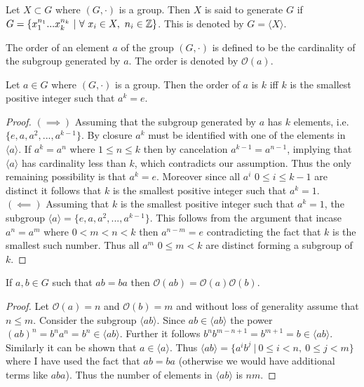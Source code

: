\begin{definition}
  Let $X\subset G$ where $(G,\cdot)$ is a group. Then $X$ is said to generate $G$ if $G = \{x_1^{n_1}...x_k^{n_k}\ |\ \forall\ x_i\in X,\ n_i\in\Z\}$. This is denoted by $G =\langle X \rangle$.
\end{definition}
\begin{definition}
  The order of an element $a$ of the group $(G,\cdot)$ is defined to be the cardinality of the subgroup generated by $a$. The order is denoted by $ \mathcal{O}(a)$.
\end{definition}
\begin{proposition}
  Let $a\in G$ where $(G,\cdot)$ is a group. Then the order of $a$ is $k$ iff $k$ is the smallest positive integer such that $a^k =e$.
\end{proposition}
\begin{proof}
  $(\implies)$ Assuming that the subgroup generated by $a$ has $k$ elements, i.e. $\{e,a,a^2,...,a^{k-1}\}$. By closure $a^k$ must be identified with one of the elements in $ \langle a \rangle$. If $a^k = a^n$ where $1\leq n\leq k$ then by cancelation $a^{k-1} = a^{n-1}$, implying that $ \langle a \rangle$ has cardinality less than $k$, which contradicts our assumption. Thus the only remaining possibility is that $a^k = e$. Moreover since all $a^i$ $0 \leq i\leq k-1$ are distinct it follows that $k$ is the smallest positive integer such that $a^k =1$.\\

  $(\impliedby)$ Assuming that $k$ is the smallest positive integer such that $a^k =1$, the subgroup $ \langle a \rangle = \{e, a, a^2, ..., a^{k-1}\}$. This follows from the argument that incase $a^n = a^m$ where $0<m<n<k$ then $a^{n-m} = e$ contradicting the fact that $k$ is the smallest such number. Thus all $a^m$ $0\leq m<k$ are distinct forming a subgroup of $k$.
\end{proof}
\begin{proposition}
  If $a,b\in G$ such that $ab= ba$ then $ \mathcal{O}(ab) = \mathcal{O}(a) \mathcal{O}(b)$.
\end{proposition}
\begin{proof}
  Let $ \mathcal{O}(a) = n$ and $ \mathcal{O}(b) = m$ and without loss of generality assume that $n\leq m$. Consider the subgroup $ \langle ab \rangle$. Since $ab\in \langle ab \rangle$ the power $(ab)^n = b^n a^n = b^n \in \langle ab \rangle$. Further it follows $b^nb^{m-n+1} = b^{m+1} = b\in \langle ab \rangle$. Similarly it can be shown that $a\in \langle a \rangle$. Thus $ \langle ab \rangle = \{a^i b^j\ |\ 0 \leq i < n,\ 0\leq j<m\}$ where I have used the fact that $ab=ba$ (otherwise we would have additional terms like $aba$). Thus the number of elements in $ \langle ab \rangle$ is $nm$.
\end{proof}
